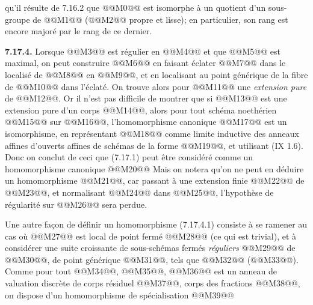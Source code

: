 
qu'il résulte de 7.16.2 que @@M0@@ est isomorphe à un quotient d'un sous-groupe de @@M1@@ (@@M2@@ propre et lisse); en particulier, son rang est encore majoré par le rang de ce dernier.

\textbf{7.17.4.} Lorsque @@M3@@ est régulier en @@M4@@ et que @@M5@@ est maximal, on peut construire @@M6@@ en faisant éclater @@M7@@ dans le localisé de @@M8@@ en @@M9@@, et en localisant au point générique de la fibre de @@M10@@ dans l'éclaté. On trouve alors pour @@M11@@ une \emph{extension pure} de @@M12@@. Or il n'est pas difficile de montrer que si @@M13@@ est une extension pure d'un corps @@M14@@, alors pour tout schéma noethérien @@M15@@ sur @@M16@@, l'homomorphisme canonique @@M17@@ est un isomorphisme, en représentant @@M18@@ comme limite inductive des anneaux affines d'ouverts affines de schémas de la forme @@M19@@, et utilisant (IX 1.6). Donc on conclut de ceci que (7.17.1) peut être considéré comme un homomorphisme canonique
@@M20@@
Mais on notera qu'on ne peut en déduire un homomorphisme @@M21@@, car passant à une extension finie @@M22@@ de @@M23@@, et normalisant @@M24@@ dans @@M25@@, l'hypothèse de régularité sur @@M26@@ sera perdue.

Une autre façon de définir un homomorphisme (7.17.4.1) consiste à se ramener au cas où @@M27@@ est local de point fermé @@M28@@ (ce qui est trivial), et à considérer une suite croissante de sous-schémas fermés \emph{réguliers} @@M29@@ de @@M30@@, de point générique @@M31@@, tels que @@M32@@ (@@M33@@). Comme pour tout @@M34@@, @@M35@@, @@M36@@ est un anneau de valuation discrète de corps résiduel @@M37@@, corps des fractions @@M38@@, on dispose d'un homomorphisme de spécialisation
@@M39@@
